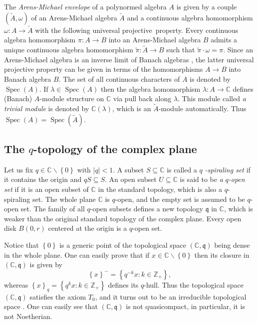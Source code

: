\documentclass[12pt,reqno]{amsart}%
\theoremstyle{plain}
\numberwithin{theorem}{section} \numberwithin{equation}{section}
\numberwithin{lemma}{section}
\numberwithin{remark}{section}
\numberwithin{example}{section}
\numberwithin{proposition}{section}
\numberwithin{definition}{section}
\numberwithin{corollary}{section}
\begin{document}
The \textit{Arens-Michael envelope} \cite[5.2.21]{Hel} of a polynormed algebra
$A$ is given by a couple $\left(  \widetilde{A},\omega\right)  $ of an
Arens-Michael algebra $\widetilde{A}$ and a continuous algebra homomorphism
$\omega:A\rightarrow\widetilde{A}$ with the following universal
projective\ property. Every continuous algebra homomorphism $\pi:A\rightarrow
B$ into an Arens-Michael algebra $B$ admits a unique continuous algebra
homomorphism $\widetilde{\pi}:\widetilde{A}\rightarrow B$ such that
$\widetilde{\pi}\cdot\omega=\pi$. Since an Arens-Michael algebra is an inverse
limit of Banach algebras \cite[5.2.10]{Hel}, the latter universal projective
property can be given in terms of the homomorphisms $A\rightarrow B$ into
Banach algebra $B$. The set of all continuous characters of $A$ is denoted by
$\operatorname{Spec}\left(  A\right)  $. If $\lambda\in\operatorname{Spec}%
\left(  A\right)  $ then the algebra homomorphism $\lambda:A\rightarrow
\mathbb{C}$ defines (Banach) $A$-module structure on $\mathbb{C}$ via pull
back along $\lambda$. This module called \textit{a trivial module} is denoted
by $\mathbb{C}\left(  \lambda\right)  $, which is an $\widetilde{A}$-module
automatically. Thus $\operatorname{Spec}\left(  A\right)  =\operatorname{Spec}%
\left(  \widetilde{A}\right)  $.

\subsection{The $q$-topology of the complex plane\label{subsecQT}}

Let us fix $q\in\mathbb{C}\backslash\left\{  0\right\}  $ with $\left\vert
q\right\vert <1$. A subset $S\subseteq\mathbb{C}$ is called a $q$%
\textit{-spiraling set }if it contains the origin and $qS\subseteq S$. An open
subset $U\subseteq\mathbb{C}$ is said to be \textit{a }$q$\textit{-open set}
if it is an open subset of $\mathbb{C}$ in the standard topology, which is
also a $q$-spiraling set. The whole plane $\mathbb{C}$ is $q$-open, and the
empty set is assumed to be $q$-open set. The family of all $q$-open subsets
defines a new topology $\mathfrak{q}$ in $\mathbb{C}$, which is weaker than
the original standard topology of the complex plane. Every open disk $B\left(
0,r\right)  $ centered at the origin is a $q$-open set.

Notice that $\left\{  0\right\}  $ is a generic point of the topological space
$\left(  \mathbb{C},\mathfrak{q}\right)  $ being dense in the whole plane. One
can easily prove that if $x\in\mathbb{C}\backslash\left\{  0\right\}  $ then
its closure in $\left(  \mathbb{C},\mathfrak{q}\right)  $ is given by
\[
\left\{  x\right\}  ^{-}=\left\{  q^{-k}x:k\in\mathbb{Z}_{+}\right\}  ,
\]
whereas $\left\{  x\right\}  _{q}=\left\{  q^{k}x:k\in\mathbb{Z}_{+}\right\}
$ defines its $q$-hull. Thus the topological space $\left(  \mathbb{C}%
,\mathfrak{q}\right)  $ satisfies the axiom $T_{0}$, and it turns out to be an
irreducible topological space \cite[II, 4.1]{BurComA}. One can easily see that
$\left(  \mathbb{C},\mathfrak{q}\right)  $ is not quasicompact, in particular,
it is not Noetherian.
\end{document}
